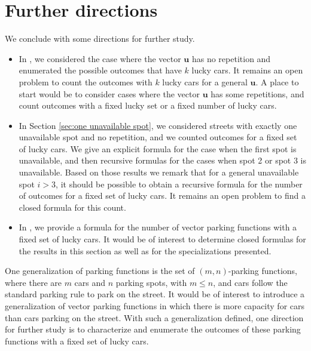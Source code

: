 \documentclass[reqno]{amsart}
\theoremstyle{definition}
\theoremstyle{remark}
\newcommand{\bsy}{\boldsymbol}
\begin{document}
\section{Further directions}\label{sec:future work}
We conclude with some directions for further study.
\begin{itemize}
    \item 
In , we considered the case where the vector $\bsy u$ has no repetition and enumerated the possible outcomes that have $k$ lucky cars. 
It remains an open problem to count the outcomes with $k$ lucky cars for a general $\bsy u$. A place to start would be to consider cases where the vector $\bsy u$ has some repetitions, and count outcomes with a fixed lucky set or a fixed number of lucky cars.



\item In Section \ref{sec:one unavailable spot}, we considered streets with exactly one unavailable spot and no repetition, and we counted outcomes for a fixed set of lucky cars. 
We give an explicit formula for the case when the first spot is unavailable, and then recursive formulas for the cases when spot 2 or spot 3 is unavailable. Based on those results we remark that for a general unavailable spot $i>3$, it should be possible to obtain a recursive formula for the number of outcomes for a fixed set of lucky cars. It remains an open problem to find a closed formula for this count. 


\item In ,  we provide a formula for the number of vector parking functions with a fixed set of lucky cars. It would be of interest to determine closed formulas 
for the results in this section as well as for the specializations presented. 

\end{itemize}


One generalization of parking functions is the set of $(m,n)$-parking functions, where there are $m$ cars and $n$ parking spots, with $m\leq n$, and cars follow the standard parking rule to park on the street. 
It would be of interest to introduce a generalization of vector parking functions in which there is more capacity for cars than cars parking on the street. 
With such a generalization defined, one direction for further study is to characterize and enumerate the outcomes of these parking functions with a fixed set of lucky cars.
\end{document}
